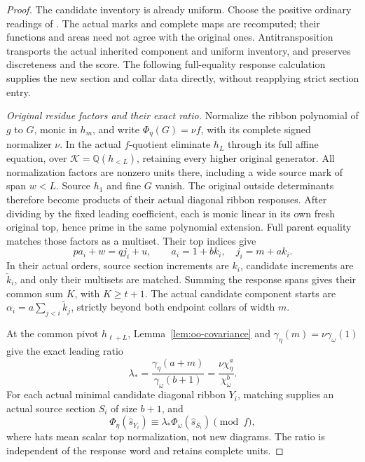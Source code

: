 \documentclass[11pt,a4paper]{amsart}
\numberwithin{equation}{section}
\theoremstyle{plain}
\theoremstyle{definition}
\begin{document}
\begin{proof}
The candidate inventory is already uniform.  Choose the positive ordinary readings of .  The actual marks and complete maps are recomputed; their functions and areas need not agree with the original ones.  Antitransposition transports the actual inherited component and uniform inventory, and preserves discreteness and the score.  The following full-equality response calculation supplies the new section and collar data directly, without reapplying strict section entry.

\emph{Original residue factors and their exact ratio.}
Normalize the ribbon polynomial of \(g\) to \(G\), monic in \(h_m\), and write \(\Phi_\eta(G)=\nu f\), with its complete signed normalizer \(\nu\).  In the actual \(f\)-quotient eliminate \(h_L\) through its full affine equation, over \(\mathcal K=\mathbb Q(h_{<L})\), retaining every higher original generator.  All normalization factors are nonzero units there, including a wide source mark of span \(w<L\).  Source \(h_1\) and fine \(G\) vanish.  The original outside determinants therefore become products of their actual diagonal ribbon responses.  After dividing by the fixed leading coefficient, each is monic linear in its own fresh original top, hence prime in the same polynomial extension.  Full parent equality matches those factors as a multiset.  Their top indices give
\[
 pa_i+w=qj_i+u,\qquad a_i=1+bk_i,\quad j_i=m+ak_i.
\]
In their actual orders, source section increments are \(k_i\), candidate increments are \(\widetilde k_i\), and only their multisets are matched.  Summing the response spans gives their common sum \(K\), with \(K\ge t+1\).  The actual candidate component starts are \(\alpha_i=a\sum_{j<i}\widetilde k_j\), strictly beyond both endpoint collars of width \(m\).

At the common pivot \(h_{\ell+L}\), Lemma~\ref{lem:oo-covariance} and \(\gamma_\eta(m)=\nu\gamma_\omega(1)\) give the exact leading ratio
\[
 \lambda_*=\frac{\gamma_\eta(a+m)}{\gamma_\omega(b+1)}
           =\frac{\nu\chi_\eta^a}{\chi_\omega^b}.
\]
For each actual minimal candidate diagonal ribbon \(Y_i\), matching supplies an actual source section \(S_i\) of size \(b+1\), and
\[
 \Phi_\eta(\widehat s_{Y_i})
 \equiv\lambda_*\Phi_\omega(\widehat s_{S_i})\pmod f,
\]
where hats mean scalar top normalization, not new diagrams.  The ratio is independent of the response word and retains complete units.


\end{proof}
\end{document}
